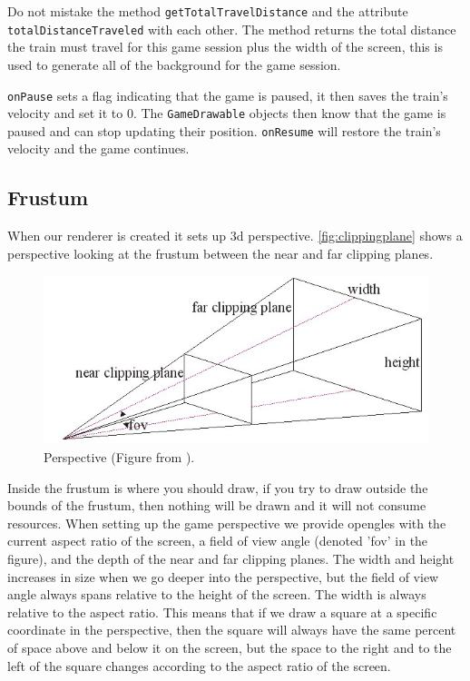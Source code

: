 \begin{description}
Do not mistake the method \lstinline|getTotalTravelDistance| and the attribute \lstinline|totalDistanceTraveled| with each other. The method returns the total distance the train must travel for this game session plus the width of the screen, this is used to generate all of the background for the game session.

\lstinline|onPause| sets a flag indicating that the game is paused, it then saves the train's velocity and set it to 0. The \lstinline|GameDrawable| objects then know that the game is paused and can stop updating their position. \lstinline|onResume| will restore the train's velocity and the game continues.

\end{description}

\subsection{Frustum}\label{sec:frustum}

When our renderer is created it sets up \ac{3d} perspective. \autoref{fig:clippingplane} shows a perspective looking at the frustum between the near and far clipping planes.
\begin{figure}[H]
\centering
\includegraphics[width=0.9\linewidth]{img/clippingplane.jpg}
\caption{Perspective (Figure from \citep{clippingplane}).}
\label{fig:clippingplane}
\end{figure}
Inside the frustum is where you should draw, if you try to draw outside the bounds of the frustum, then nothing will be drawn and it will not consume resources. When setting up the game perspective we provide \ac{opengles} with the current aspect ratio of the screen, a field of view angle (denoted 'fov' in the figure), and the depth of the near and far clipping planes. The width and height increases in size when we go deeper into the perspective, but the field of view angle always spans relative to the height of the screen. The width is always relative to the aspect ratio. This means that if we draw a square at a specific coordinate in the perspective, then the square will always have the same percent of space above and below it on the screen, but the space to the right and to the left of the square changes according to the aspect ratio of the screen.

